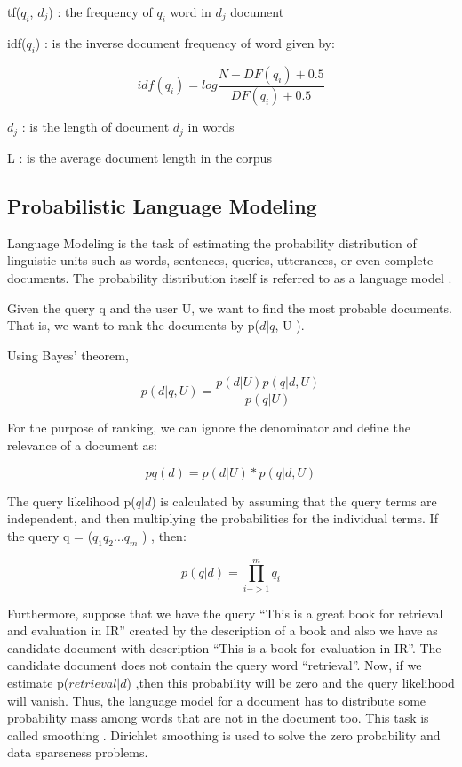 tf($q_i$, $d_j$) : the frequency of $q_i$ word in $d_j$ document

idf($q_i$) : is the inverse document frequency of word given by:

\begin{equation}
idf(q_i) = log \frac{ N-DF(q_i) + 0.5 } { DF(q_i) +0.5 }
\end{equation}

$d_j$ : is the length of document $d_j$ in words

L : is the average document length in the corpus

\subsection{Probabilistic Language Modeling}

Language Modeling is the task of estimating the probability distribution of linguistic units such as words, sentences, queries, utterances, or even complete documents. The probability distribution itself is referred to as a language model \cite{CroftLafferty}.


Given the query q and the user U, we want to find the most probable documents. That is, we want to rank the documents by p($d|q$, U ).

Using Bayes' theorem,

\begin{equation}
p(d|q, U ) = \frac{p(d|U )p(q|d, U )} {p(q|U)}
\end{equation}

For the purpose of ranking, we can ignore the denominator and define the relevance of a document as:

\begin{equation}
pq (d) = p(d|U ) * p(q|d, U )
\end{equation}

The query likelihood p($q|d$) is calculated by assuming that the query terms are independent, and then multiplying the probabilities for the individual terms. If the query q = ($q_1 q_2 \ldots q_m$ ) , then:

\[p(q|d) =\prod_{i->1}^{m} q_i\]


Furthermore, suppose that we have the query ``This is a great book for retrieval and evaluation in IR'' created by the description of a book and also we have as candidate document with description ``This is a book for evaluation in IR''. The candidate document does not contain the query word ``retrieval''. Now, if we estimate p($retrieval|d$) ,then this probability will be zero and the query likelihood will vanish. Thus, the language model for a document has to distribute some probability mass among words that are not in the document too. This task is called smoothing  \cite{ZhaiLaferty}. Dirichlet smoothing is used to solve the zero probability and data sparseness problems.

